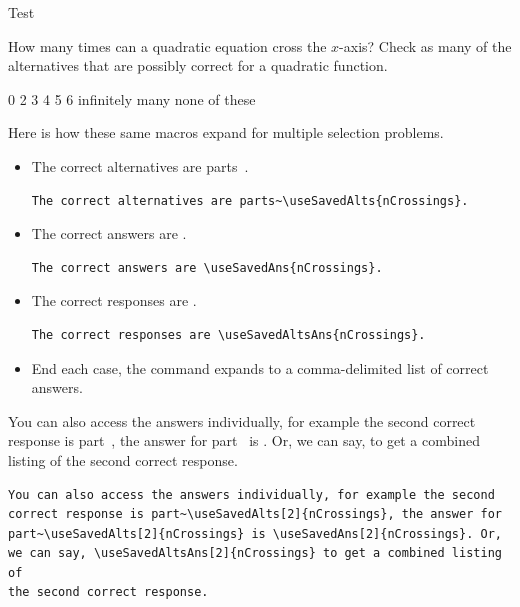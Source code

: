 \documentclass{article}
\begin{document}
\begin{exam}{Test\nExam}
\begin{theseproblems}
\begin{problem*}[2ea]
\begin{parts}
    \item How many times can a quadratic equation cross the $x$-axis?
    Check as many of the alternatives that are possibly correct for a
    quadratic function.
    \begin{manswers}{4}
    \bChoices[label=nCrossings]
         0\eAns
         2\eAns
         3\eAns
         4\eAns
         5\eAns
         6\eAns
         infinitely many\eAns
         none of these\eAns
    \eChoices
    \end{manswers}
\begin{solution}[]\ifvspacewithsolns
Here is how these same macros expand for multiple selection problems.
\begin{itemize}
\item The correct alternatives are parts~.
\begin{verbatim}
The correct alternatives are parts~\useSavedAlts{nCrossings}.
\end{verbatim}
\item The correct answers are .
\begin{verbatim}
The correct answers are \useSavedAns{nCrossings}.
\end{verbatim}
\item The correct responses are .
\begin{verbatim}
The correct responses are \useSavedAltsAns{nCrossings}.
\end{verbatim}
\item[] End each case, the command expands to a comma-delimited list of correct
answers.
\end{itemize}
You can also access the answers individually, for example the second
correct response is part~, the answer for
part~ is . Or,
we can say,  to get a combined listing of
the second correct response.
\begin{verbatim}
You can also access the answers individually, for example the second
correct response is part~\useSavedAlts[2]{nCrossings}, the answer for
part~\useSavedAlts[2]{nCrossings} is \useSavedAns[2]{nCrossings}. Or,
we can say, \useSavedAltsAns[2]{nCrossings} to get a combined listing of
the second correct response.
\end{verbatim}
\fi
\end{solution}
\end{parts}
\end{problem*}


\end{theseproblems}
\end{exam}
\end{document}
